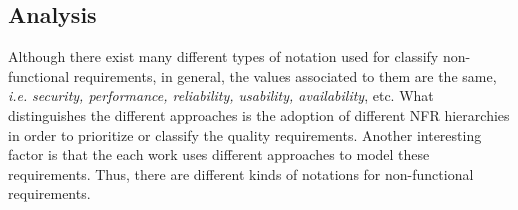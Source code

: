 \documentclass{sig-alternate}
\begin{document}
\subsection{Analysis}
\label{sec:proposal}


Although there exist many different types of notation used for classify
non-functional requirements, in general, the values associated to them are the
same, \textit{i.e.} \textit{security, performance, reliability, usability, availability}, etc. What
distinguishes the different approaches is the adoption of different NFR
hierarchies in order to prioritize or classify the quality requirements. 
Another interesting factor
is that the each work uses different approaches to model these requirements.
Thus, there are different kinds of notations for non-functional
requirements.
\end{document}
